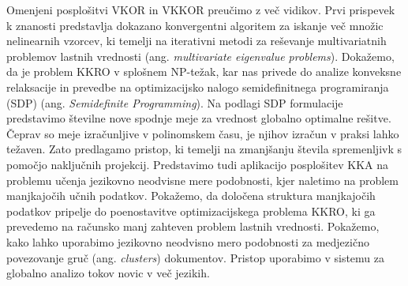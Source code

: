 Omenjeni posplošitvi VKOR in VKKOR preučimo z več vidikov. Prvi prispevek k znanosti predstavlja
dokazano konvergentni algoritem za iskanje več množic nelinearnih vzorcev,
ki temelji na iterativni metodi za reševanje multivariatnih problemov lastnih vrednosti (ang.
\emph{multivariate eigenvalue problems}). Dokažemo, da je problem KKRO v splošnem NP-težak,
kar nas privede do analize konveksne relaksacije in prevedbe na optimizacijsko nalogo
semidefinitnega programiranja (SDP) (ang. \emph{Semidefinite Programming}). Na podlagi
SDP formulacije predstavimo številne nove spodnje meje za vrednost globalno optimalne
rešitve. Čeprav so meje izračunljive v polinomskem času, je njihov izračun v praksi
lahko težaven. Zato predlagamo pristop, ki temelji na zmanjšanju števila spremenljivk s
pomočjo naključnih projekcij. Predstavimo tudi aplikacijo posplošitev KKA na problemu
učenja jezikovno neodvisne mere podobnosti, kjer naletimo na problem manjkajočih
učnih podatkov. Pokažemo, da določena struktura manjkajočih podatkov pripelje do
poenostavitve optimizacijskega problema KKRO, ki ga prevedemo na računsko manj zahteven
problem lastnih vrednosti. Pokažemo, kako lahko uporabimo jezikovno neodvisno mero podobnosti
za medjezično povezovanje gruč (ang. \emph{clusters}) dokumentov. Pristop uporabimo v sistemu za globalno analizo
tokov novic v več jezikih.


